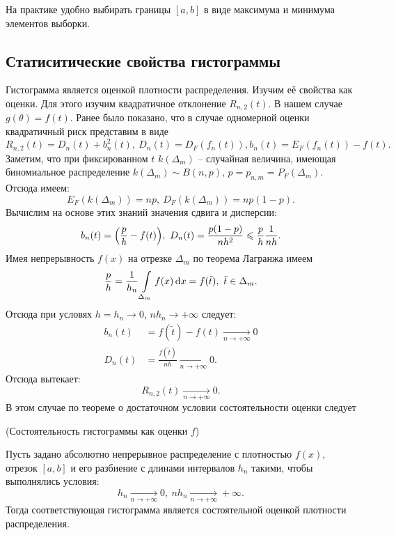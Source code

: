 \begin{remark}
    На практике удобно выбирать границы $[a, b]$ в виде максимума и минимума
    элементов выборки.
\end{remark}

\subsection{Статиситические свойства гистограммы}
Гистограмма является оценкой плотности распределения. Изучим её свойства как
оценки. Для этого изучим квадратичное отклонение $R_{n, 2}(t)$. В нашем случае
$g(\theta) = f(t)$. Ранее было показано, что в случае одномерной оценки
квадратичный риск представим в виде
\[
    R_{n, 2}(t) = D_n(t) + b^2_n(t),~ D_n(t) = D_F(f_n(t)), 
    b_n(t) = E_F(f_n(t)) - f(t)
.\]
Заметим, что при фиксированном $t$ $k(\Delta_m)$ -- случайная величина,
имеющая биномиальное распределение $k(\Delta_m) \sim B(n, p)$, $p = p_{n, m}
= P_F(\Delta_m)$. Отсюда имеем:
\[
    E_F(k(\Delta_m)) = np,~ D_F(k(\Delta_m)) = np(1 - p)
.\]
Вычислим на основе этих знаний значения сдвига и дисперсии:
\[
    b_n(t) = \parens*{\frac{p}{h} - f(t)},~ D_n(t) = \frac{p(1 - p)}{n h^2} 
    \leqslant \frac{p}{h} \frac{1}{nh}
.\]
Имея непрерывность $f(x)$ на отрезке $\Delta_m$ по теорема Лагранжа имеем
\[
    \frac{p}{h} = \frac{1}{h_n} \int\limits_{\Delta_m}{f(x) \,\mathrm{d} x} = f(\tilde{t}),~ 
    \tilde{t} \in \Delta_m
.\]
Отсюда при условях $h = h_n \to 0$, $nh_n \to +\infty$ следует:
\begin{align*}
    b_n(t) &= f(\tilde{t}) - f(t) \xrightarrow[n \to +\infty]{} 0 \\ 
    D_n(t) &= \frac{f(\tilde{t})}{nh} \xrightarrow[n \to +\infty]{} 0
.\end{align*}
Отсюда вытекает:
\[
    R_{n, 2}(t) \xrightarrow[n \to +\infty]{} 0
.\]
В этом случае по теореме о достаточном условии состоятельности оценки
следует

\begin{theorem}(Состоятельность гистограммы как оценки $f$)
   
    Пусть задано абсолютно непрерывное распределение с плотностью $f(x)$,
    отрезок $[a, b]$ и его разбиение с длинами интервалов $h_n$ такими,
    чтобы выполнялись условия:
    \[
        h_n \xrightarrow[n \to +\infty]{} 0,~ nh_n \xrightarrow[n \to +\infty]
        {} +\infty
    .\]
    Тогда соответствующая гистограмма является состоятельной оценкой плотности
    распределения.
\end{theorem}

